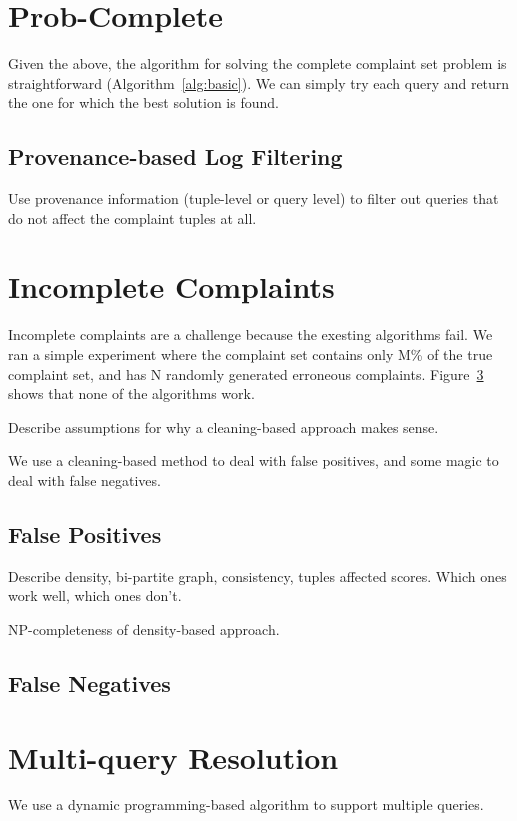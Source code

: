 \section{Prob-Complete}

Given the above, the algorithm for solving the complete complaint set problem is straightforward (Algorithm~\ref{alg:basic}).
We can simply try each query and return the one for which the best solution is found.

\subsection{Provenance-based Log Filtering}

Use provenance information (tuple-level or query level) to filter out queries that do not 
affect the complaint tuples at all.





\section{Incomplete Complaints}
\label{s:incomplete-algs}

Incomplete complaints are a challenge because the exesting algorithms fail.  We ran a simple experiment
where the complaint set contains only M\% of the true complaint set, and has N randomly generated erroneous complaints.
Figure~\ref{} shows that none of the algorithms work.

Describe assumptions for why a cleaning-based approach makes sense.

We use a cleaning-based method to deal with false positives, and some magic to deal with false negatives.

\subsection{False Positives}

Describe density, bi-partite graph, consistency, tuples affected scores.  Which ones work well, which ones don't.

NP-completeness of density-based approach.


\subsection{False Negatives}



\section{Multi-query Resolution}

We use a dynamic programming-based algorithm to support multiple queries.


